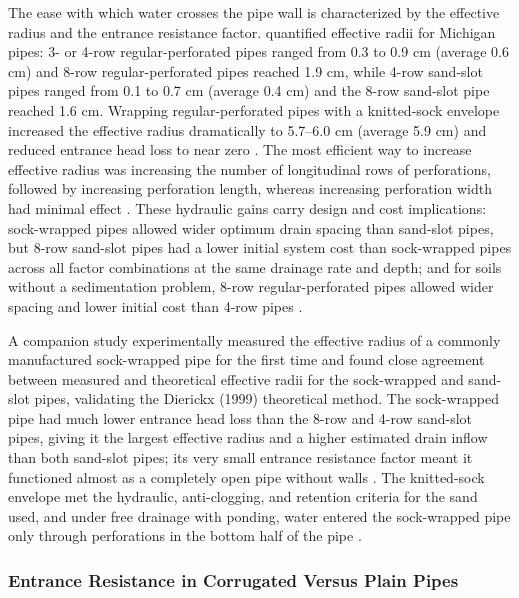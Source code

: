 \documentclass[11pt]{article}
\begin{document}
The ease with which water crosses the pipe wall is characterized by the effective radius
and the entrance resistance factor. \textcite{Ghane2022b} quantified effective radii for
Michigan pipes: 3- or 4-row regular-perforated pipes ranged from 0.3 to 0.9 cm (average
0.6 cm) and 8-row regular-perforated pipes reached 1.9 cm, while 4-row sand-slot pipes
ranged from 0.1 to 0.7 cm (average 0.4 cm) and the 8-row sand-slot pipe reached 1.6 cm.
Wrapping regular-perforated pipes with a knitted-sock envelope increased the effective
radius dramatically to 5.7--6.0 cm (average 5.9 cm) and reduced entrance head loss to near
zero \parencite{Ghane2022b}. The most efficient way to increase effective radius was
increasing the number of longitudinal rows of perforations, followed by increasing
perforation length, whereas increasing perforation width had minimal effect
\parencite{Ghane2022b}. These hydraulic gains carry design and cost implications:
sock-wrapped pipes allowed wider optimum drain spacing than sand-slot pipes, but 8-row
sand-slot pipes had a lower initial system cost than sock-wrapped pipes across all factor
combinations at the same drainage rate and depth; and for soils without a sedimentation
problem, 8-row regular-perforated pipes allowed wider spacing and lower initial cost than
4-row pipes \parencite{Ghane2022b}.

A companion study \parencite{Ghane2022} experimentally measured the effective radius of a
commonly manufactured sock-wrapped pipe for the first time and found close agreement
between measured and theoretical effective radii for the sock-wrapped and sand-slot pipes,
validating the Dierickx (1999) theoretical method. The sock-wrapped pipe had much lower
entrance head loss than the 8-row and 4-row sand-slot pipes, giving it the largest
effective radius and a higher estimated drain inflow than both sand-slot pipes; its very
small entrance resistance factor meant it functioned almost as a completely open pipe
without walls \parencite{Ghane2022}. The knitted-sock envelope met the hydraulic,
anti-clogging, and retention criteria for the sand used, and under free drainage with
ponding, water entered the sock-wrapped pipe only through perforations in the bottom half
of the pipe \parencite{Ghane2022}.

\subsubsection{Entrance Resistance in Corrugated Versus Plain Pipes}
\end{document}
